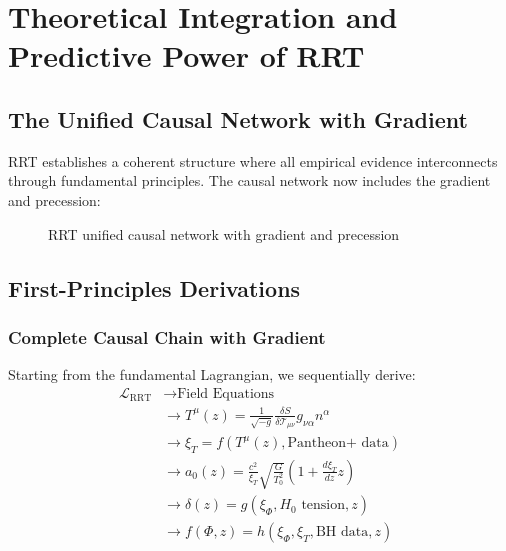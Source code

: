 \documentclass[12pt,a4paper]{article}
\begin{document}
\section{Theoretical Integration and Predictive Power of RRT}

\subsection{The Unified Causal Network with Gradient}
RRT establishes a coherent structure where all empirical evidence interconnects through fundamental principles. The causal network now includes the gradient and precession:

\begin{figure}[H]
\centering
{}
\caption{RRT unified causal network with gradient and precession}
\end{figure}

\subsection{First-Principles Derivations}

\subsubsection{Complete Causal Chain with Gradient}
Starting from the fundamental Lagrangian, we sequentially derive:
\begin{align}
    \mathcal{L}_{\text{RRT}} &\rightarrow \text{Field Equations} \\
    &\rightarrow T^\mu(z) = \frac{1}{\sqrt{-g}} \frac{\delta S}{\delta \mathcal{T}_{\mu\nu}} g_{\nu\alpha} n^\alpha \\
    &\rightarrow \xi_T = f(T^\mu(z), \text{Pantheon+ data}) \\
    &\rightarrow a_0(z) = \frac{c^2}{\xi_T} \sqrt{\frac{G}{T_0^2}} \left( 1 + \frac{d\xi_T}{dz} z \right) \\
    &\rightarrow \delta(z) = g(\xi_\Phi, H_0 \text{ tension}, z) \\
    &\rightarrow f(\Phi, z) = h(\xi_\Phi, \xi_T, \text{BH data}, z)
\end{align}
\end{document}
